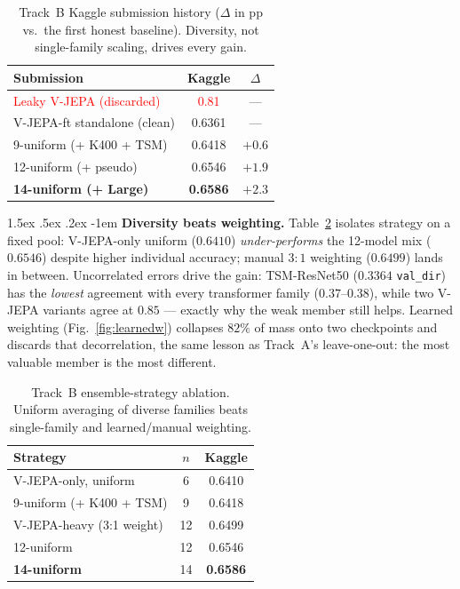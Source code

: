 \documentclass[10pt,twocolumn,letterpaper]{article}
\makeatletter
\renewcommand\paragraph{\@startsection{paragraph}{4}{\z@}%
  {1.5ex \@plus .5ex \@minus .2ex}%
  {-1em}%
  {\normalfont\normalsize\bfseries}}
\makeatother
\begin{document}
\begin{table}[t]
\centering\small
\setlength{\tabcolsep}{5pt}
\begin{tabular}{@{}lcc@{}}
\toprule
Submission & Kaggle & $\Delta$ \\
\midrule
\textcolor{red}{Leaky V-JEPA (discarded)} & \textcolor{red}{0.81} & --- \\
V-JEPA-ft standalone (clean)   & 0.6361 & --- \\
9-uniform (+ K400 + TSM)       & 0.6418 & $+0.6$ \\
12-uniform (+ pseudo)          & 0.6546 & $+1.9$ \\
\textbf{14-uniform (+ Large)}  & \textbf{0.6586} & $+2.3$ \\
\bottomrule
\end{tabular}
\caption{Track~B Kaggle submission history ($\Delta$ in pp vs.\ the first honest
baseline). Diversity, not single-family scaling, drives every gain.}
\label{tab:kaggle}
\end{table}

\paragraph{\textbf{Diversity beats weighting.}}
Table~\ref{tab:strategy} isolates strategy on a fixed pool: V-JEPA-only uniform
($0.6410$) \emph{under-performs} the 12-model mix ($0.6546$) despite higher
individual accuracy; manual $3{:}1$ weighting ($0.6499$) lands in between.
Uncorrelated errors drive the gain: TSM-ResNet50 ($0.3364$ \texttt{val\_dir})
has the \emph{lowest} agreement with every transformer family ($0.37$--$0.38$),
while two V-JEPA variants agree at $0.85$ --- exactly why the weak member still
helps. Learned weighting (Fig.~\ref{fig:learnedw}) collapses $82\%$ of mass
onto two checkpoints and discards that decorrelation, the same lesson as
Track~A's leave-one-out: the most valuable member is the most different.

\begin{table}[t]
\centering\small
\setlength{\tabcolsep}{5pt}
\begin{tabular}{@{}lcc@{}}
\toprule
Strategy & $n$ & Kaggle \\
\midrule
V-JEPA-only, uniform        & 6  & 0.6410 \\
9-uniform (+ K400 + TSM)    & 9  & 0.6418 \\
V-JEPA-heavy (3:1 weight)   & 12 & 0.6499 \\
12-uniform                  & 12 & 0.6546 \\
\textbf{14-uniform}         & 14 & \textbf{0.6586} \\
\bottomrule
\end{tabular}
\caption{Track~B ensemble-strategy ablation. Uniform averaging of diverse
families beats single-family and learned/manual weighting.}
\label{tab:strategy}
\end{table}
\end{document}
